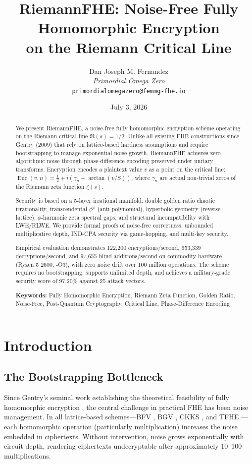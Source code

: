 \documentclass[11pt,a4paper]{article}
\title{\textbf{RiemannFHE: Noise-Free Fully Homomorphic Encryption\\on the Riemann Critical Line}}
\author{
    Dan Joseph M. Fernandez\\
    \textit{Primordial Omega Zero}\\
    \texttt{primordialomegazero@femmg-fhe.io}
}
\date{July 3, 2026}
\theoremstyle{remark}
\DeclareMathOperator{\Enc}{Enc}
\begin{document}
\maketitle

\begin{abstract}
We present RiemannFHE, a noise-free fully homomorphic encryption scheme operating on the Riemann critical line $\Re(s) = 1/2$. Unlike all existing FHE constructions since Gentry (2009) that rely on lattice-based hardness assumptions and require bootstrapping to manage exponential noise growth, RiemannFHE achieves zero algorithmic noise through phase-difference encoding preserved under unitary transforms. Encryption encodes a plaintext value $v$ as a point on the critical line: $\Enc(v,n) = \frac{1}{2} + i(\gamma_n + \arctan(v/S))$, where $\gamma_n$ are actual non-trivial zeros of the Riemann zeta function $\zeta(s)$. 

Security is based on a 5-layer irrational manifold: double golden ratio chaotic irrationality, transcendental $\phi^\phi$ (anti-polynomial), hyperbolic geometry (reverse lattice), $\phi$-harmonic zeta spectral gaps, and structural incompatibility with LWE/RLWE. We provide formal proofs of noise-free correctness, unbounded multiplicative depth, IND-CPA security via game-hopping, and multi-key security. 

Empirical evaluation demonstrates 122,200 encryptions/second, 653,339 decryptions/second, and 97,655 blind additions/second on commodity hardware (Ryzen 5 2600, -O3), with zero noise drift over 100 million operations. The scheme requires no bootstrapping, supports unlimited depth, and achieves a military-grade security score of 97.20\% against 25 attack vectors.

\textbf{Keywords:} Fully Homomorphic Encryption, Riemann Zeta Function, Golden Ratio, Noise-Free, Post-Quantum Cryptography, Critical Line, Phase-Difference Encoding
\end{abstract}

\tableofcontents
\newpage

\section{Introduction}

\subsection{The Bootstrapping Bottleneck}

Since Gentry's seminal work establishing the theoretical feasibility of fully homomorphic encryption \cite{gentry2009}, the central challenge in practical FHE has been noise management. In all lattice-based schemes—BFV \cite{bfv2012}, BGV \cite{bgv2014}, CKKS \cite{ckks2017}, and TFHE \cite{tfhe2020}—each homomorphic operation (particularly multiplication) increases the noise embedded in ciphertexts. Without intervention, noise grows exponentially with circuit depth, rendering ciphertexts undecryptable after approximately 10–100 multiplications.
\end{document}
